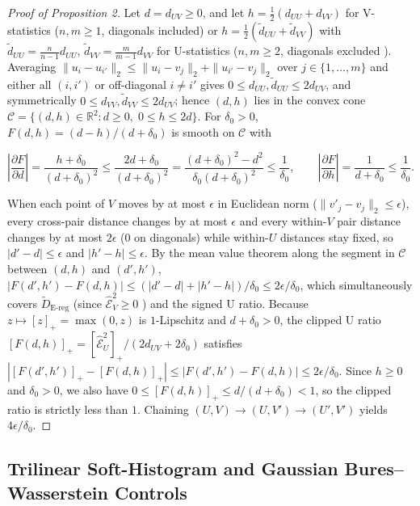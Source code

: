 \documentclass[10pt,letterpaper]{article}
\theoremstyle{definition}
\newcommand{\Dereg}{\tilde D_{\mathrm{E\mbox{-}reg}}}
\begin{document}
\begin{proof}[Proof of Proposition 2]

Let $d=d_{UV}\ge 0$, and let $h=\tfrac12(d_{UU}+d_{VV})$ for V-statistics ($n,m\ge 1$, diagonals included) or $h=\tfrac12(\tilde d_{UU}+\tilde d_{VV})$ with $\tilde d_{UU}=\frac{n}{n-1}d_{UU}$, $\tilde d_{VV}=\frac{m}{m-1}d_{VV}$ for U-statistics ($n,m\ge 2$, diagonals excluded \cite{ref28}). Averaging $\|u_i-u_{i'}\|_2\le\|u_i-v_j\|_2+\|u_{i'}-v_j\|_2$ over $j\in\{1,\ldots,m\}$ and either all $(i,i')$ or off-diagonal $i\ne i'$ gives $0\le d_{UU},\tilde d_{UU}\le 2d_{UV}$, and symmetrically $0\le d_{VV},\tilde d_{VV}\le 2d_{UV}$; hence $(d,h)$ lies in the convex cone $\mathcal C=\{(d,h)\in\mathbb R^2:d\ge 0,\;0\le h\le 2d\}$. For $\delta_0>0$, $F(d,h)=(d-h)/(d+\delta_0)$ is smooth on $\mathcal C$ with


\[
\left|\frac{\partial F}{\partial d}\right|=\frac{h+\delta_0}{(d+\delta_0)^2}\le\frac{2d+\delta_0}{(d+\delta_0)^2}=\frac{(d+\delta_0)^2-d^2}{\delta_0(d+\delta_0)^2}\le\frac{1}{\delta_0},\qquad\left|\frac{\partial F}{\partial h}\right|=\frac{1}{d+\delta_0}\le\frac{1}{\delta_0}.
\]

When each point of $V$ moves by at most $\epsilon$ in Euclidean norm ($\|v'_j-v_j\|_2\le\epsilon$), every cross-pair distance changes by at most $\epsilon$ and every within-$V$ pair distance changes by at most $2\epsilon$ ($0$ on diagonals) while within-$U$ distances stay fixed, so $|d'-d|\le\epsilon$ and $|h'-h|\le\epsilon$. By the mean value theorem along the segment in $\mathcal C$ between $(d,h)$ and $(d',h')$, $|F(d',h')-F(d,h)|\le(|d'-d|+|h'-h|)/\delta_0\le 2\epsilon/\delta_0$, which simultaneously covers $\Dereg{}$ (since $\widehat{\mathcal E}_V^2\ge 0$ \cite{ref27}) and the signed U ratio. Because $z\mapsto[z]_+=\max(0,z)$ is $1$-Lipschitz and $d+\delta_0>0$, the clipped U ratio $[F(d,h)]_+=[\widehat{\mathcal E}_U^2]_+/(2d_{UV}+2\delta_0)$ satisfies $|[F(d',h')]_+-[F(d,h)]_+|\le|F(d',h')-F(d,h)|\le 2\epsilon/\delta_0$. Since $h\ge 0$ and $\delta_0>0$, we also have $0\le[F(d,h)]_+\le d/(d+\delta_0)<1$, so the clipped ratio is strictly less than $1$. Chaining $(U,V)\to(U,V')\to(U',V')$ yields $4\epsilon/\delta_0$.\end{proof}

\subsection*{Trilinear Soft-Histogram and Gaussian Bures--Wasserstein Controls}
\end{document}
